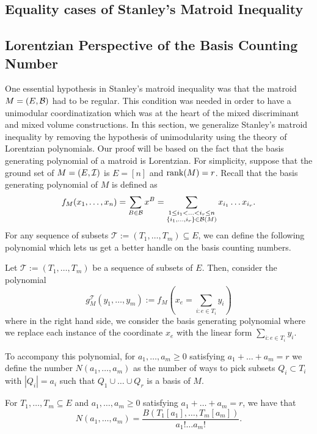 \documentclass{puthesis-UG}
\begin{document}
\subsection{Equality cases of Stanley's Matroid Inequality}

\subsection{Lorentzian Perspective of the Basis Counting Number}

One essential hypothesis in Stanley's matroid inequality was that the matroid $M = (E, \mathcal{B})$ had to be regular. This condition was needed in order to have a unimodular coordinatization which was at the heart of the mixed discriminant and mixed volume constructions. In this section, we generalize Stanley's matroid inequality by removing the hypothesis of unimodularity using the theory of Lorentzian polynomials. Our proof will be based on the fact that the basis generating polynomial of a matroid is Lorentzian. For simplicity, suppose that the ground set of $M = (E, \mathcal{I})$ is $E = [n]$ and $\operatorname{rank} (M) = r$. Recall that the basis generating polynomial of $M$ is defined as 
\[
	f_M(x_1, \ldots, x_n) = \sum_{B \in \mathcal{B}} x^B = \sum_{\substack{1 \leq i_1 < \ldots < i_r \leq n \\ \{i_1, \ldots, i_r\} \in \mathcal{B} (M)}} x_{i_1} \ldots x_{i_r}.
\]
For any sequence of subsets $\mathcal{T} := (T_1, \ldots, T_m) \subseteq E$, we can define the following polynomial which lets us get a better handle on the basis counting numbers. 

\begin{defn}
	Let $\mathcal{T} := (T_1, \ldots, T_m)$ be a sequence of subsets of $E$. Then, consider the polynomial 
	\[
		g_M^\mathcal{T} (y_1, \ldots, y_m) := f_M \left (x_e = \sum_{i : e \in T_i} y_i \right )
	\]
	where in the right hand side, we consider the basis generating polynomial where we replace each instance of the coordinate $x_e$ with the linear form $\sum_{i : e \in T_i} y_i$. 
\end{defn}

To accompany this polynomial, for $a_1, \ldots, a_m \geq 0$ satisfying $a_1 + \ldots + a_m = r$ we define the number $N(a_1, \ldots, a_m)$ as the number of ways to pick subsets $Q_i \subset T_i$ with $|Q_i| = a_i$ such that $Q_1 \cup \ldots \cup Q_r$ is a basis of $M$. 
\begin{lem} \label{lem-simplifying-N-to-B}
	For $T_1, \ldots, T_m \subseteq E$ and $a_1, \ldots, a_m \geq 0$ satisfying $a_1 + \ldots + a_m = r$, we have that 
	\[	
		N(a_1, \ldots, a_m) = \frac{B(T_1[a_1], \ldots, T_m[a_m])}{a_1! \ldots a_m!}.
	\]
\end{lem}
\end{document}
